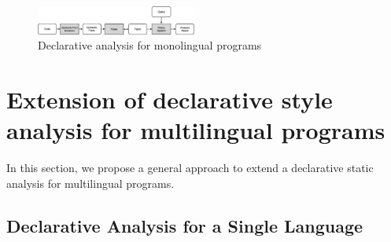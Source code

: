 \begin{figure}[t]
  \centering
  \vspace{2mm}
  \includegraphics[width=0.47\textwidth]{img/ov1.png}
  \caption{Declarative analysis for monolingual programs}
  \label{fig:ov1}
\end{figure}

\section{Extension of declarative style analysis for multilingual programs}
\label{sec:approach}

In this section, we propose a general approach to extend a declarative
static analysis for multilingual programs.

\subsection{Declarative Analysis for a Single Language}

%


